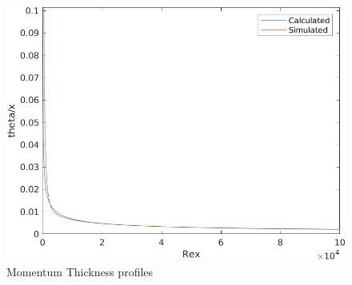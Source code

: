 \documentclass[12pt]{article}
\begin{document}
                \begin{figure}[ht!]
                        \centering
                        \includegraphics[width=\textwidth]{Momentum.png}
                        \caption{Momentum Thickness profiles}
                        \label{fig:Momentum}
                \end{figure}



\end{document}
